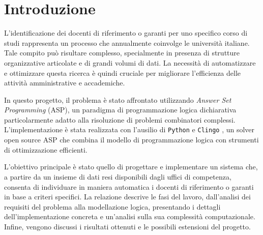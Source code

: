 \section{Introduzione} L'identificazione dei docenti di riferimento o garanti
per uno specifico corso di studi rappresenta un processo che annualmente
coinvolge le università italiane. Tale compito può risultare complesso,
specialmente in presenza di strutture organizzative articolate e di grandi
volumi di dati. La necessità di automatizzare e ottimizzare questa ricerca è
quindi cruciale per migliorare l'efficienza delle attività amministrative e
accademiche.

In questo progetto, il problema è stato affrontato utilizzando \textit{Answer
Set Programming} (ASP), un paradigma di programmazione logica dichiarativa
particolarmente adatto alla risoluzione di problemi combinatori complessi.
L'implementazione è stata realizzata con l'ausilio di \texttt{Python}
\cite{python} e \texttt{Clingo} \cite{clingo}, un solver open source ASP che
combina il modello di programmazione logica con strumenti di ottimizzazione
efficienti.

L'obiettivo principale è stato quello di progettare e implementare un sistema
che, a partire da un insieme di dati resi disponibili dagli uffici di
competenza, consenta di individuare in maniera automatica i docenti di
riferimento o garanti in base a criteri specifici. La relazione descrive le fasi
del lavoro, dall'analisi dei requisiti del problema alla modellazione logica,
presentando i dettagli dell'implementazione concreta e un'analisi sulla sua
complessità computazionale. Infine, vengono discussi i risultati ottenuti e le
possibili estensioni del progetto.
